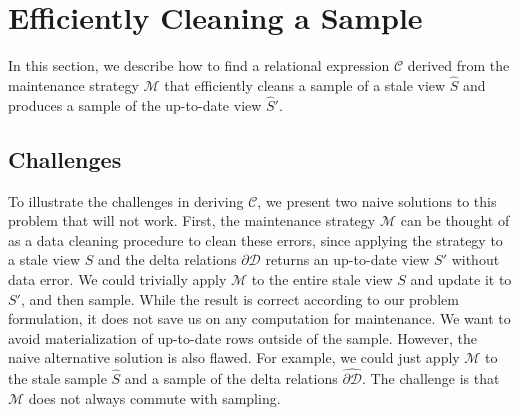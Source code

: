 \section{Efficiently Cleaning a Sample} \label{sampling}
In this section, we describe how to find a relational expression $\mathcal{C}$ derived from the maintenance strategy $\mathcal{M}$ that
efficiently cleans a sample of a stale view $\widehat{S}$ and produces a sample of the up-to-date view $\widehat{S}'$.

\subsection{Challenges}
To illustrate the challenges in deriving $\mathcal{C}$, we present two naive solutions to this problem that will not work. 
First, the maintenance strategy $\mathcal{M}$ can be thought of as a data cleaning procedure to clean these errors, since applying the strategy to a stale view $S$ and the delta relations $\partial \mathcal{D}$ returns an up-to-date view $S'$ without data error.
We could trivially apply $\mathcal{M}$ to the entire stale view $S$ and update it to $S'$, and then sample.
While the result is correct according to our problem formulation, it does not save us on any computation for maintenance.
We want to avoid materialization of up-to-date rows outside of the sample. 
However, the naive alternative solution is also flawed. 
For example, we could just apply $\mathcal{M}$ to the stale sample $\widehat{S}$ and a sample of the delta relations $\widehat{\partial \mathcal{D}}$. 
The challenge is that $\mathcal{M}$ does not always commute with sampling. 

